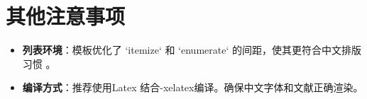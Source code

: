 \section{其他注意事项}

\begin{itemize}
  \item \textbf{列表环境}：模板优化了 `itemize` 和 `enumerate` 的间距，使其更符合中文排版习惯 。
  \item \textbf{编译方式}：推荐使用Latex 结合-xelatex编译。确保中文字体和文献正确渲染。
\end{itemize}